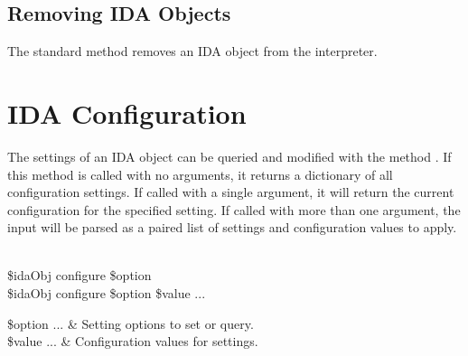 \documentclass{article}
\renewcommand{\^}[1]{\textsuperscript{#1}}
\renewcommand{\_}[1]{\textsubscript{#1}}
\begin{document}
\subsection{Removing IDA Objects}
The standard method  removes an IDA object from the interpreter. 
\begin{syntax}
\end{syntax}

\clearpage
\section{IDA Configuration}
The settings of an IDA object can be queried and modified with the method .
If this method is called with no arguments, it returns a dictionary of all configuration settings. 
If called with a single argument, it will return the current configuration for the specified setting. 
If called with more than one argument, the input will be parsed as a paired list of settings and configuration values to apply.
\begin{syntax}
 \\
\$idaObj configure \$option \\
\$idaObj configure \$option \$value ...
\end{syntax}
\begin{args}
\$option ... & Setting options to set or query. \\
\$value ... & Configuration values for settings.
\end{args}
\FloatBarrier
\end{document}

